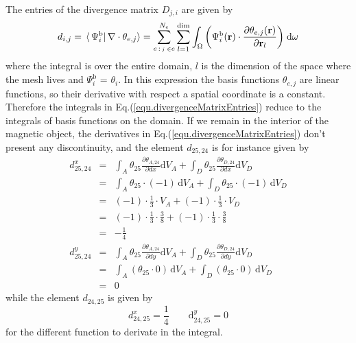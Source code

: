 \documentclass[11pt]{article}
\renewcommand{\d}{\mathrm{d}} %
\newcommand{\rv}[1]{\ensuremath{\mathbf{#1}}} %
\newcommand{\ivc}[1]{\,\langle\,#1|}
\begin{document}
The entries of the divergence matrix $D_{j, i}$ are given by 
\begin{equation}
d_{i, j} 
=  
\ivc{\Psi^\mathrm{b}_{i}} \,
\nabla \cdot \theta_{e,j} \rangle 
=
\sum_{e \,: \, \textrm{\tiny{$j \in$}\normalsize} e}^{N_e} 
\sum_{l=1}^{\mathrm{dim}} \int_\Omega 
\bigg( \Psi^\mathrm{b}_{i} (\rv{r})
\cdot \frac{\partial \theta_{e,j}(\rv{r})}
{\partial \rv{r}_l} 
\bigg) 
\; \d\omega
\label{equ.divergenceMatrixEntries}
\end{equation}
where the integral is over the entire domain, $l$ is the dimension 
of the space where the mesh lives and $\Psi^\mathrm{b}_{i}$ =
$\theta_i$. In this expression the basis functions $\theta_{e,j}$ 
are linear functions, so their derivative with respect a spatial
coordinate is a constant. Therefore the integrals in
Eq.(\ref{equ.divergenceMatrixEntries}) reduce to the integrals of
basis functions on the domain. If we remain in the interior of the
magnetic object, the derivatives in
Eq.(\ref{equ.divergenceMatrixEntries}) don't present any discontinuity,
and the element $d_{25,24}$ is for instance given by
\begin{eqnarray}
d^x_{25,24} 
& = &  
\int_{A} 
\theta_{25} 
\frac{\partial \theta_{A,24}}
{\partial dx} 
\d V_A 
+ 
\int_{D} 
\theta_{25} 
\frac{\partial \theta_{D,24}}
{\partial dx} 
\d V_D
\nonumber \\
& = &  
\int_{A} 
\theta_{25} \cdot (-1) \,
\d V_A 
+ 
\int_{D} 
\theta_{25} \cdot (-1) \,
\d V_D
\nonumber \\
& = &  
(-1) \cdot
\frac{1}{3} \cdot
V_{A} 
+ 
(-1) \cdot
\frac{1}{3} \cdot
V_{D} 
\nonumber \\
& = &  
(-1) \cdot
\frac{1}{3} \cdot
\frac{3}{8} 
+ 
(-1) \cdot
\frac{1}{3} \cdot
\frac{3}{8}
\nonumber \\
& = &  
-\frac{1}{4} 
\\
d^y_{25,24} 
& = &  
\int_{A} 
\theta_{25} 
\frac{\partial \theta_{A,24}}
{\partial dy} 
\d V_A 
+ 
\int_{D} 
\theta_{25} 
\frac{\partial \theta_{D,24}}
{\partial dy} 
\d V_D
\nonumber \\
& = &  
\int_{A} 
\left( \theta_{25} \cdot 0 \right) \,
\d V_A 
+ 
\int_{D} 
\left( \theta_{25} \cdot 0 \right) \,
\d V_D
\nonumber \\
& = &  
0
\end{eqnarray}
while the element $d_{24,25}$ is given by
\begin{equation}
d^x_{24,25}  =  \frac{1}{4} \qquad  \d^y_{24,25} = 0
\nonumber
\end{equation}
for the different function to derivate in the integral.
\end{document}
